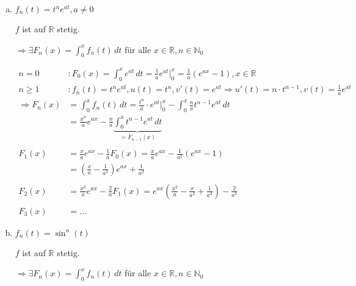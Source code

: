 \documentclass{article}
\begin{document}
\begin{enumerate}[a)]
\item $f_n(t) = t^n e^{at}, a \ne 0$

  $f$ ist auf $\mathbb{R}$ stetig.

  $\Rightarrow \exists F_n(x) = \int_0^x f_n(t) \,dt$ für alle $x \in \mathbb{R}, n \in \mathbb{N}_0$

  \begin{align*}
    n = 0 &\colon F_0(x) = \int_0^x e^{at} \,dt = \frac{1}{a} e^{at} {\Big |}_{0}^x = \frac{1}{a} \left( e^{ax} - 1 \right), x \in \mathbb{R} \\
    n \geq 1 &\colon f_n(t) = t^n e^{at}, u(t) = t^n, v'(t) = e^{at} \Rightarrow u'(t) = n \cdot t^{n-1}, v(t) = \frac{1}{a} e^{at} \\
    \Rightarrow F_n(x) &= \int_0^x f_n(t) \,dt = \frac{t^n}{a} \cdot e^{at} {\Big |}_0^x - \int_0^x \frac{n}{a} t^{n-1} e^{at} \,dt \\
          &= \frac{x^n}{a} e^{ax} - \frac{n}{a} \underset{= F_{n - 1}(x)}{\underbrace{\int_0^x t^{n - 1} e^{at} \,dt}} \\
    \\
    F_1(x) &= \frac{x}{a} e^{ax} - \frac{1}{a} F_0(x) = \frac{x}{a} e^{ax} - \frac{1}{a^2} (e^{ax} - 1) \\
          &= \left( \frac{x}{a} - \frac{1}{a^2} \right) e^{ax} + \frac{1}{a^2} \\
    \\
    F_2(x) &= \frac{x^2}{a} e^{ax} - \frac{2}{a} F_1(x) = e^{ax} \left( \frac{x^2}{a} - \frac{x}{a^2} + \frac{1}{a^3} \right) - \frac{2}{a^3} \\
    \\
    F_3(x) &= \ldots
  \end{align*}
  
\item $f_n(t) = \sin^n(t)$

  $f$ ist auf $\mathbb{R}$ stetig.

  $\Rightarrow \exists F_n(x) = \int_0^x f_n(t) \,dt$ für alle $x \in \mathbb{R}, n \in \mathbb{N}_0$


\end{enumerate}
\end{document}
